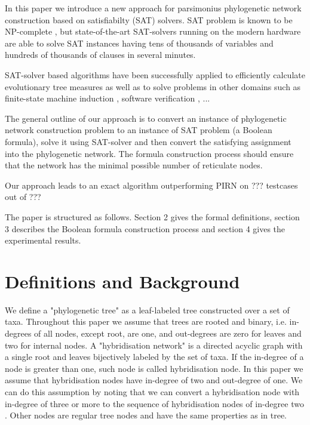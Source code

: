 \documentclass[runningheads, envcountsame, a4paper]{llncs}
\begin{document}
In this paper we introduce a new approach for parsimonius
phylogenetic network construction based on satisfiabilty (SAT) solvers.
SAT problem is known to be NP-complete \cite{}, but state-of-the-art SAT-solvers running on the modern hardware 
are able to solve SAT instances having tens of thousands of variables and hundreds of thousands of clauses in several minutes.

SAT-solver based algorithms have been successfully applied to efficiently calculate evolutionary tree measures \cite{bonet}
as well as to solve problems in other domains such as
finite-state machine induction \cite{heule}, software verification \cite{}, ...

The general outline of our approach is to convert an instance of phylogenetic network construction 
problem to an instance of SAT problem (a Boolean formula), solve it using SAT-solver and then convert 
the satisfying assignment into the phylogenetic network. The formula construction process should ensure that
the network has the minimal possible number of reticulate nodes.

Our approach leads to an exact algorithm outperforming PIRN on ??? testcases out of ???

The paper is structured as follows. Section 2 gives the formal definitions, section 3 describes the Boolean formula
construction process and section 4 gives the experimental results.

\section{Definitions and Background}

We define a "phylogenetic tree" as a leaf-labeled tree constructed over a set of taxa. Throughout this paper we assume that trees are rooted and binary, i.e. in-degrees of all nodes, except root, are one, and out-degrees are zero for leaves and two for internal nodes. A "hybridisation network" is a directed acyclic graph with a single root and leaves bijectively labeled by the set of taxa. If the in-degree of a node is greater than one, such node is called hybridisation node. In this paper we assume that hybridisation nodes have in-degree of two and out-degree of one. We can do this assumption by noting that we can convert a hybridisation node with in-degree of three or more to the sequence of hybridisation nodes of in-degree two \cite{Y. Wu. Close lower and upper bounds for the minimum reticulate network of multiple phylogenetic trees}. Other nodes are regular tree nodes and have the same properties as in tree.
\end{document}

